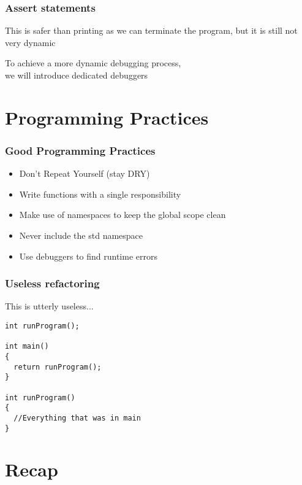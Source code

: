 \documentclass[14pt,a4paper,dvipsnames,usenames]{beamer}
\begin{document}
\begin{frame}[fragile]
  \frametitle{Assert statements}

  This is safer than printing as we can terminate the program, but it is still not very dynamic

  \vspace{1.5em}
  To achieve a more dynamic debugging process,\\we will introduce dedicated debuggers

\end{frame}

\LiveFrame

\section{Programming Practices}

\frame[plain]{\sectionpage}

\begin{frame}
  \frametitle{Good Programming Practices}

  \begin{itemize}
    \setlength\itemsep{0.5em}
    \item Don't Repeat Yourself (stay DRY)
    \item Write functions with a single responsibility
    \item Make use of namespaces to keep the global scope clean
    \item {\color{Marty}Never} include the std namespace
    \item Use debuggers to find runtime errors
  \end{itemize}
  
\end{frame}

\begin{frame}[fragile]
  \frametitle{Useless refactoring}

  This is utterly useless...

  \vspace{.5em}
  \begin{lstlisting}
int runProgram();

int main()
{
  return runProgram();
}

int runProgram()
{
  //Everything that was in main
}
  \end{lstlisting}
  
\end{frame}

\section{Recap}
\end{document}
